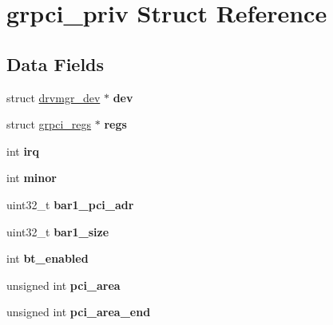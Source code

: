 \hypertarget{structgrpci__priv}{}\section{grpci\+\_\+priv Struct Reference}
\label{structgrpci__priv}
\subsection*{Data Fields}
\begin{DoxyCompactItemize}
\item 
\mbox{\label{structgrpci__priv_a0cd528a4767670bee0a81088e583a1ea}} 
struct \mbox{\hyperlink{structdrvmgr__dev}{drvmgr\+\_\+dev}} $\ast$ {\bfseries dev}
\item 
\mbox{\label{structgrpci__priv_a098c58d11aab9d0f56b68b7da6d9b72b}} 
struct \mbox{\hyperlink{structgrpci__regs}{grpci\+\_\+regs}} $\ast$ {\bfseries regs}
\item 
\mbox{\label{structgrpci__priv_ac4a07c06f0b657daa7bc55182b8a0c1e}} 
int {\bfseries irq}
\item 
\mbox{\label{structgrpci__priv_ab78533d0a864cb44cbd1225ef2b11a7e}} 
int {\bfseries minor}
\item 
\mbox{\label{structgrpci__priv_a67908837de0aabc4b53fbe05d7a56bd1}} 
uint32\+\_\+t {\bfseries bar1\+\_\+pci\+\_\+adr}
\item 
\mbox{\label{structgrpci__priv_a3f048799936ed8d6defcb1018dabfa3f}} 
uint32\+\_\+t {\bfseries bar1\+\_\+size}
\item 
\mbox{\label{structgrpci__priv_a376d74cf82310312a53f780ed9287e45}} 
int {\bfseries bt\+\_\+enabled}
\item 
\mbox{\label{structgrpci__priv_aa28a5ac77a73d190f7433990d48c70c3}} 
unsigned int {\bfseries pci\+\_\+area}
\item 
\mbox{\label{structgrpci__priv_a599e639842b6b4ed9a50e74a5dfec09b}} 
unsigned int {\bfseries pci\+\_\+area\+\_\+end}
\item 

\end{DoxyCompactItemize}

